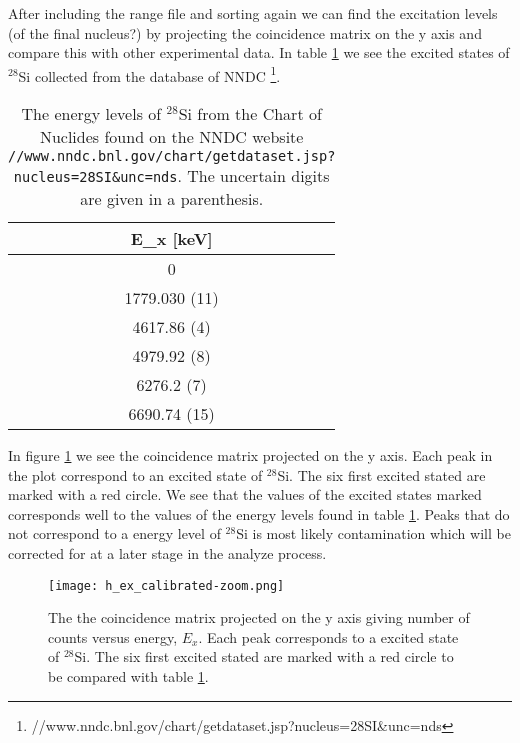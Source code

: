 \documentclass[11pt,a4wide]{article}
\begin{document}
After including the range file and sorting again we can find the excitation levels (of the final nucleus?) by projecting the coincidence matrix on the y axis and compare this with other experimental data. In table \ref{tab: e_levels} we see the excited states of ${}^{28}$Si collected from the database of NNDC \footnote{//www.nndc.bnl.gov/chart/getdataset.jsp?nucleus=28SI\&unc=nds}. 

\begin{table}
\centering
\caption{The energy levels of ${}^{28}$Si from the Chart of Nuclides found on the NNDC website \texttt{//www.nndc.bnl.gov/chart/getdataset.jsp?nucleus=28SI\&unc=nds}. The uncertain digits are given in a parenthesis. }
\begin{tabular}{|c|}
\hline 
E\_x [keV] \\ 
\hline 
0 \\ 
\hline 
1779.030 (11) \\ 
\hline 
4617.86 (4) \\ 
\hline 
4979.92 (8) \\ 
\hline 
6276.2 (7) \\ 
\hline 
6690.74 (15) \\ 
\hline 
\end{tabular} 
\label{tab: e_levels}
\end{table}

In figure \ref{fig: proj_y_excitation} we see the coincidence matrix projected on the y axis. Each peak in the plot correspond to an excited state of ${}^{28}$Si. The six first excited stated are marked with a red circle. We see that the values of the excited states marked corresponds well to the values of the energy levels found in table \ref{tab: e_levels}. Peaks that do not correspond to a energy level of ${}^{28}$Si is most likely contamination which will be corrected for at a later stage in the analyze process. 

\begin{figure}[htp]
\centering
\texttt{[image: h\_ex\_calibrated-zoom.png]}
\caption{The the coincidence matrix projected on the y axis giving number of counts versus energy, $E_x$. Each peak corresponds to a excited state of ${}^{28}$Si. The six first excited stated are marked with a red circle to be compared with table \ref{tab: e_levels}. }
\label{fig: proj_y_excitation}
\end{figure}

\end{document}
